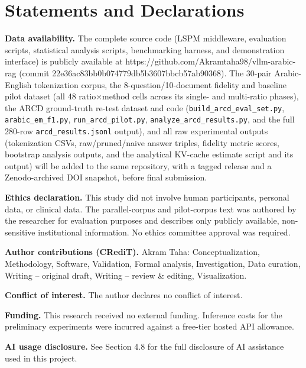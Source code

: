 \documentclass[pdflatex,sn-basic,Numbered]{sn-jnl}
\begin{document}
\section*{Statements and Declarations}
\textbf{Data availability.} The complete source code (LSPM middleware, evaluation scripts, statistical analysis scripts, benchmarking harness, and demonstration interface) is publicly available at https://github.com/Akramtaha98/vllm-arabic-rag (commit 22e36ac83bb0b074779db5b3607bbcb57ab90368). The 30-pair Arabic-English tokenization corpus, the 8-question/10-document fidelity and baseline pilot dataset (all 48 ratio$\times$method cells across its single- and multi-ratio phases), the ARCD ground-truth re-test dataset and code (\texttt{build\_arcd\_eval\_set.py}, \texttt{arabic\_em\_f1.py}, \texttt{run\_arcd\_pilot.py}, \texttt{analyze\_arcd\_results.py}, and the full 280-row \texttt{arcd\_results.jsonl} output), and all raw experimental outputs (tokenization CSVs, raw/pruned/naive answer triples, fidelity metric scores, bootstrap analysis outputs, and the analytical KV-cache estimate script and its output) will be added to the same repository, with a tagged release and a Zenodo-archived DOI snapshot, before final submission.

\textbf{Ethics declaration.} This study did not involve human participants, personal data, or clinical data. The parallel-corpus and pilot-corpus text was authored by the researcher for evaluation purposes and describes only publicly available, non-sensitive institutional information. No ethics committee approval was required.

\textbf{Author contributions (CRediT).} Akram Taha: Conceptualization, Methodology, Software, Validation, Formal analysis, Investigation, Data curation, Writing -- original draft, Writing -- review \& editing, Visualization.

\textbf{Conflict of interest.} The author declares no conflict of interest.

\textbf{Funding.} This research received no external funding. Inference costs for the preliminary experiments were incurred against a free-tier hosted API allowance.

\textbf{AI usage disclosure.} See Section 4.8 for the full disclosure of AI assistance used in this project.
\end{document}
